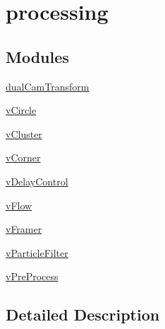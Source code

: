 \hypertarget{group__processing}{}\section{processing}
\label{group__processing}
\subsection*{Modules}
\begin{DoxyCompactItemize}
\item 
\hyperlink{group__dualCamTransform}{dual\+Cam\+Transform}
\item 
\hyperlink{group__vCircle}{v\+Circle}
\item 
\hyperlink{group__vCluster}{v\+Cluster}
\item 
\hyperlink{group__vCorner}{v\+Corner}
\item 
\hyperlink{group__vDelayControl}{v\+Delay\+Control}
\item 
\hyperlink{group__vFlow}{v\+Flow}
\item 
\hyperlink{group__vFramer}{v\+Framer}
\item 
\hyperlink{group__vParticleFilter}{v\+Particle\+Filter}
\item 
\hyperlink{group__vPreProcess}{v\+Pre\+Process}
\end{DoxyCompactItemize}


\subsection{Detailed Description}
